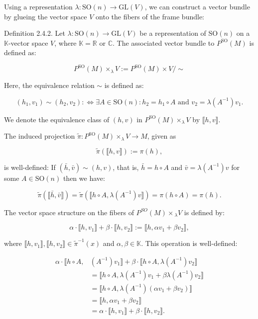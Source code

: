 \documentclass[10pt, letterpaper]{article}
\begin{document}
Using a representation $\lambda: \mathrm{SO}(n) \rightarrow \mathrm{GL}(V)$, we can construct a vector bundle by glueing the vector space $V$ onto the fibers of the frame bundle:

Definition 2.4.2. Let $\lambda: \mathrm{SO}(n) \rightarrow \mathrm{GL}(V)$ be a representation of $\mathrm{SO}(n)$ on a $\mathbb{K}$-vector space $V$, where $\mathbb{K}=\mathbb{R}$ or $\mathbb{C}$. The associated vector bundle to $P^{\mathrm{SO}}(M)$ is defined as:

$$
P^{\mathrm{SO}}(M) \times_{\lambda} V:=P^{\mathrm{SO}}(M) \times V / \sim
$$

Here, the equivalence relation $\sim$ is defined as:

$$
\left(h_{1}, v_{1}\right) \sim\left(h_{2}, v_{2}\right): \Longleftrightarrow \exists A \in \mathrm{SO}(n): h_{2}=h_{1} \circ A \text { and } v_{2}=\lambda\left(A^{-1}\right) v_{1} .
$$

We denote the equivalence class of $(h, v)$ in $P^{\mathrm{SO}}(M) \times_{\lambda} V$ by $\llbracket h, v \rrbracket$.

The induced projection $\widetilde{\pi}: P^{\mathrm{SO}}(M) \times_{\lambda} V \rightarrow M$, given as

$$
\widetilde{\pi}(\llbracket h, v \rrbracket):=\pi(h),
$$

is well-defined: If $(\bar{h}, \bar{v}) \sim(h, v)$, that is, $\bar{h}=h \circ A$ and $\bar{v}=\lambda\left(A^{-1}\right) v$ for some $A \in \mathrm{SO}(n)$ then we have:

$$
\widetilde{\pi}(\llbracket \bar{h}, \bar{v} \rrbracket)=\widetilde{\pi}\left(\llbracket h \circ A, \lambda\left(A^{-1}\right) v \rrbracket\right)=\pi(h \circ A)=\pi(h) .
$$

The vector space structure on the fibers of $P^{S O}(M) \times{ }_{\lambda} V$ is defined by:

$$
\alpha \cdot \llbracket h, v_{1} \rrbracket+\beta \cdot \llbracket h, v_{2} \rrbracket:=\llbracket h, \alpha v_{1}+\beta v_{2} \rrbracket,
$$

where $\llbracket h, v_{1} \rrbracket, \llbracket h, v_{2} \rrbracket \in \widetilde{\pi}^{-1}(x)$ and $\alpha, \beta \in \mathbb{K}$. This operation is well-defined:

$$
\begin{aligned}
\alpha \cdot \llbracket h \circ A, & \left(A^{-1}\right) v_{1} \rrbracket+\beta \cdot \llbracket h \circ A, \lambda\left(A^{-1}\right) v_{2} \rrbracket \\
& =\llbracket h \circ A, \lambda\left(A^{-1}\right) v_{1}+\beta \lambda\left(A^{-1}\right) v_{2} \rrbracket \\
& =\llbracket h \circ A, \lambda\left(A^{-1}\right)\left(\alpha v_{1}+\beta v_{2}\right) \rrbracket \\
& =\llbracket h, \alpha v_{1}+\beta v_{2} \rrbracket \\
& =\alpha \cdot \llbracket h, v_{1} \rrbracket+\beta \cdot \llbracket h, v_{2} \rrbracket .
\end{aligned}
$$
\end{document}
